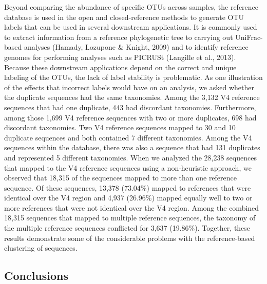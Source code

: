 \documentclass[11pt,]{article}
\begin{document}
Beyond comparing the abundance of specific OTUs across samples, the
reference database is used in the open and closed-reference methods to
generate OTU labels that can be used in several downstream applications.
It is commonly used to extract information from a reference phylogenetic
tree to carrying out UniFrac-based analyses (Hamady, Lozupone \& Knight,
2009) and to identify reference genomes for performing analyses such as
PICRUSt (Langille et al., 2013). Because these downstream applications
depend on the correct and unique labeling of the OTUs, the lack of label
stability is problematic. As one illustration of the effects that
incorrect labels would have on an analysis, we asked whether the
duplicate sequences had the same taxonomies. Among the 3,132 V4
reference sequences that had one duplicate, 443 had discordant
taxonomies. Furthermore, among those 1,699 V4 reference sequences with
two or more duplicates, 698 had discordant taxonomies. Two V4 reference
sequences mapped to 30 and 10 duplicate sequences and both contained 7
different taxonomies. Among the V4 sequences within the database, there
was also a sequence that had 131 duplicates and represented 5 different
taxonomies. When we analyzed the 28,238 sequences that mapped to the V4
reference sequences using a non-heuristic approach, we observed that
18,315 of the sequences mapped to more than one reference sequence. Of
these sequences, 13,378 (73.04\%) mapped to references that were
identical over the V4 region and 4,937 (26.96\%) mapped equally well to
two or more references that were not identical over the V4 region. Among
the combined 18,315 sequences that mapped to multiple reference
sequences, the taxonomy of the multiple reference sequences conflicted
for 3,637 (19.86\%). Together, these results demonstrate some of the
considerable problems with the reference-based clustering of sequences.

\subsection{Conclusions}\label{conclusions}
\end{document}
